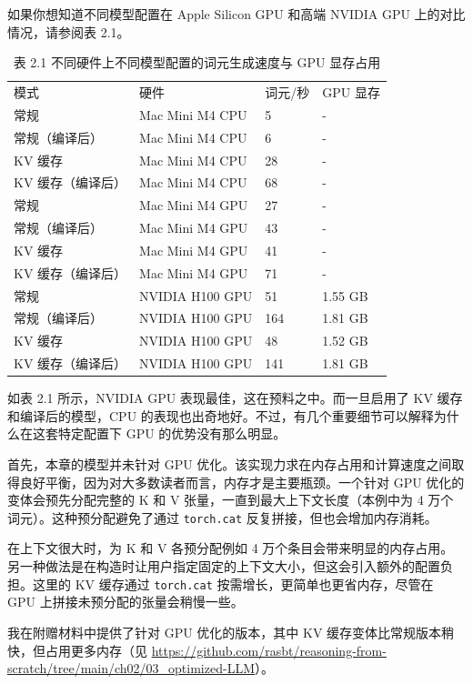 如果你想知道不同模型配置在 Apple Silicon GPU 和高端 NVIDIA GPU 上的对比情况，请参阅表 2.1。

\begin{table}[htbp]
\centering\small
\centering
\caption{表 2.1 不同硬件上不同模型配置的词元生成速度与 GPU 显存占用}
\begin{tabularx}{\linewidth}{XXXX}
\toprule
模式 & 硬件 & 词元/秒 & GPU 显存 \\
常规 & Mac Mini M4 CPU & 5 & - \\
常规（编译后） & Mac Mini M4 CPU & 6 & - \\
KV 缓存 & Mac Mini M4 CPU & 28 & - \\
KV 缓存（编译后） & Mac Mini M4 CPU & 68 & - \\ \addlinespace

常规 & Mac Mini M4 GPU & 27 & - \\
常规（编译后） & Mac Mini M4 GPU & 43 & - \\
KV 缓存 & Mac Mini M4 GPU & 41 & - \\
KV 缓存（编译后） & Mac Mini M4 GPU & 71 & - \\ \addlinespace

常规 & NVIDIA H100 GPU & 51 & 1.55 GB \\
常规（编译后） & NVIDIA H100 GPU & 164 & 1.81 GB \\
KV 缓存 & NVIDIA H100 GPU & 48 & 1.52 GB \\
KV 缓存（编译后） & NVIDIA H100 GPU & 141 & 1.81 GB \\ \bottomrule
\end{tabularx}
\end{table}

如表 2.1 所示，NVIDIA GPU 表现最佳，这在预料之中。而一旦启用了 KV 缓存和编译后的模型，CPU 的表现也出奇地好。不过，有几个重要细节可以解释为什么在这套特定配置下 GPU 的优势没有那么明显。

首先，本章的模型并未针对 GPU 优化。该实现力求在内存占用和计算速度之间取得良好平衡，因为对大多数读者而言，内存才是主要瓶颈。一个针对 GPU 优化的变体会预先分配完整的 K 和 V 张量，一直到最大上下文长度（本例中为 4 万个词元）。这种预分配避免了通过 \texttt{torch.cat} 反复拼接，但也会增加内存消耗。

在上下文很大时，为 K 和 V 各预分配例如 4 万个条目会带来明显的内存占用。另一种做法是在构造时让用户指定固定的上下文大小，但这会引入额外的配置负担。这里的 KV 缓存通过 \texttt{torch.cat} 按需增长，更简单也更省内存，尽管在 GPU 上拼接未预分配的张量会稍慢一些。

我在附赠材料中提供了针对 GPU 优化的版本，其中 KV 缓存变体比常规版本稍快，但占用更多内存（见 \href{https://github.com/rasbt/reasoning-from-scratch/tree/main/ch02/03\_optimized-LLM}{https://github.com/rasbt/reasoning-from-scratch/tree/main/ch02/03\_optimized-LLM}）。

